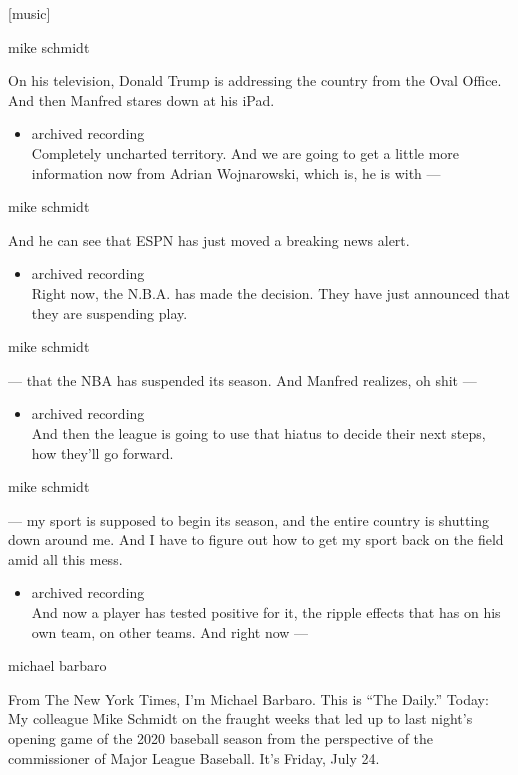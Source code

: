 {[}music{]}

mike schmidt

On his television, Donald Trump is addressing the country from the Oval
Office. And then Manfred stares down at his iPad.

\begin{itemize}
\tightlist
\item
  archived recording\\
  Completely uncharted territory. And we are going to get a little more
  information now from Adrian Wojnarowski, which is, he is with ---
\end{itemize}

mike schmidt

And he can see that ESPN has just moved a breaking news alert.

\begin{itemize}
\tightlist
\item
  archived recording\\
  Right now, the N.B.A. has made the decision. They have just announced
  that they are suspending play.
\end{itemize}

mike schmidt

--- that the NBA has suspended its season. And Manfred realizes, oh shit
---

\begin{itemize}
\tightlist
\item
  archived recording\\
  And then the league is going to use that hiatus to decide their next
  steps, how they'll go forward.
\end{itemize}

mike schmidt

--- my sport is supposed to begin its season, and the entire country is
shutting down around me. And I have to figure out how to get my sport
back on the field amid all this mess.

\begin{itemize}
\tightlist
\item
  archived recording\\
  And now a player has tested positive for it, the ripple effects that
  has on his own team, on other teams. And right now ---
\end{itemize}

michael barbaro

From The New York Times, I'm Michael Barbaro. This is ``The Daily.''
Today: My colleague Mike Schmidt on the fraught weeks that led up to
last night's opening game of the 2020 baseball season from the
perspective of the commissioner of Major League Baseball. It's Friday,
July 24.

